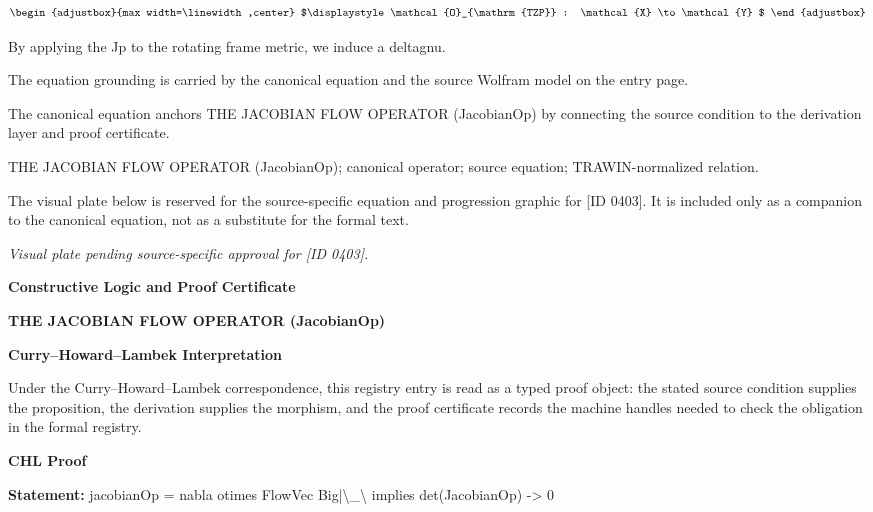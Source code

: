\[
\begin{adjustbox}{max width=\linewidth,center}
$\displaystyle
\mathcal{O}_{\mathrm{TZP}} : \mathcal{X} \to \mathcal{Y}
$
\end{adjustbox}
\]

By applying the Jp to the rotating frame metric, we induce a deltagnu.

The equation grounding is carried by the canonical equation and the source Wolfram model on the entry page.

The canonical equation anchors THE JACOBIAN FLOW OPERATOR (JacobianOp) by connecting the source condition to the derivation layer and proof certificate.

THE JACOBIAN FLOW OPERATOR (JacobianOp); canonical operator; source equation; TRAWIN-normalized relation.
\endgroup

\begingroup\footnotesize\sloppy
The visual plate below is reserved for the source-specific equation and progression graphic for [ID 0403]. It is included only as a companion to the canonical equation, not as a substitute for the formal text.
\par\endgroup
\begingroup\footnotesize\itshape
Visual plate pending source-specific approval for [ID 0403].
\par\endgroup

\clearpage
\begingroup\tzpsupportsetup
\noindent\textbf{\fontsize{10.8pt}{12.8pt}\selectfont [ID 0403] Constructive Logic and Proof Certificate}\par
\noindent\textbf{\fontsize{10pt}{12pt}\selectfont THE JACOBIAN FLOW OPERATOR (JacobianOp)}\par
\vspace{0.45em}
\begingroup
\footnotesize
\setlength{\parskip}{0.22em}
\setlength{\parindent}{0pt}
\noindent\textbf{Curry--Howard--Lambek Interpretation}\par
Under the Curry--Howard--Lambek correspondence, this registry entry is read as a typed proof
object: the stated source condition supplies the proposition, the derivation supplies the
morphism, and the proof certificate records the machine handles needed to check the obligation
in the formal registry.

\vspace{0.45em}
\noindent\textbf{CHL Proof}\par
\textbf{Statement:} jacobianOp = nabla otimes FlowVec Big|\textbackslash{}\_\textbackslash{} implies det(JacobianOp) -> 0


